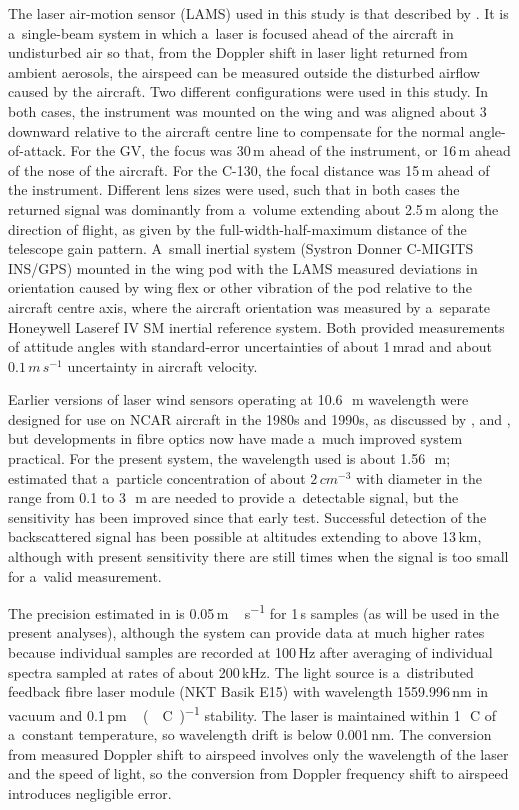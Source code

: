 \documentclass[amtd, online, hvmath]{copernicus}
\begin{document}
The laser air-motion sensor (LAMS) used in this study is that
described by \citet{SpulerEtAl2011}. It is a~single-beam system in
which a~laser is focused ahead of the aircraft in undisturbed air so
that, from the Doppler shift in laser light returned from ambient
aerosols, the airspeed can be measured outside the disturbed airflow
caused by the aircraft. Two different configurations were used in this
study.  In both cases, the instrument was mounted on the wing and was
aligned about 3{\degree} downward relative to the aircraft
centre line to compensate for the normal angle-of-attack. For the GV,
the focus was 30\,m ahead of the instrument, or 16\,m ahead of the
nose of the aircraft. For the C-130, the focal distance was 15\,m
ahead of the instrument. Different lens sizes were used, such that in
both cases the returned signal was dominantly from a~volume extending
about 2.5\,m along the direction of flight, as given by the
full-width-half-maximum distance of the telescope gain
pattern. A~small inertial system (Systron Donner C-MIGITS INS/GPS)
mounted in the wing pod with the LAMS measured deviations in
orientation caused by wing flex or other vibration of the pod relative
to the aircraft centre axis, where the aircraft orientation was
measured by a~separate Honeywell Laseref IV SM inertial reference
system. Both provided measurements of attitude angles with
standard-error uncertainties of about 1\,\unit{mrad} and about
$0.1\,\unit{m\,s^{-1}}$ uncertainty in aircraft velocity.

Earlier versions of laser wind sensors operating at
10.6\,\unit{{\mu}m} wavelength were designed for use on NCAR aircraft
in the 1980s and 1990s, as discussed by \citet{KeelerEtAl1987},
\citet{KristensenLenschow1987} and \citet{MayorEtAl1997}, but
developments in fibre optics now have made a~much improved system
practical. For the present system, the wavelength used is about
1.56\,\unit{{\mu}m}; \citet{SpulerEtAl2011} estimated that a~particle
concentration of about $2\,\unit{cm^{-3}}$ with diameter in the range
from 0.1 to 3\,\unit{{\mu}m} are needed to provide a~detectable
signal, but the sensitivity has been improved since that early test.
Successful detection of the backscattered signal has been possible at
altitudes extending to above 13\,km, although with present sensitivity
there are still times when the signal is too small for a~valid
measurement.

The precision estimated in \citet{SpulerEtAl2011} is
0.05\,\unit{m\,s^{-1}} for 1\,s samples (as will be used in the
present analyses), although the system can provide data at much higher
rates because individual samples are recorded at 100\,\unit{Hz} after
averaging of individual spectra sampled at rates of about
200\,kHz. The light source is a~distributed feedback fibre laser
module (NKT Basik E15) with wavelength 1559.996\,nm in vacuum and
0.1\,\unit{pm\,({\degree}C)^{-1}} stability. The laser is maintained
within 1\,\unit{{\degree}C} of a~constant temperature, so wavelength
drift is below 0.001\,nm. The conversion from measured Doppler shift
to airspeed involves only the wavelength of the laser and the speed of
light, so the conversion from Doppler frequency shift to airspeed
introduces negligible error.
\end{document}

